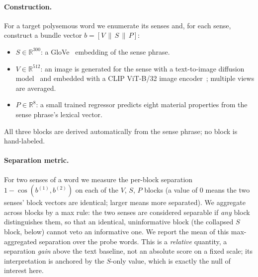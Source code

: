 \documentclass[twoside,11pt]{article}
\begin{document}
\paragraph{Construction.}
For a target polysemous word we enumerate its senses and, for each sense, construct a bundle vector $b = [V \,\|\, S \,\|\, P]$:
\begin{itemize}
\item $S \in \mathbb{R}^{300}$: a GloVe~\citep{pennington2014} embedding of the sense phrase.
\item $V \in \mathbb{R}^{512}$: an image is generated for the sense with a text-to-image diffusion model~\citep{rombach2022} and embedded with a CLIP ViT-B/32 image encoder~\citep{radford2021}; multiple views are averaged.
\item $P \in \mathbb{R}^{8}$: a small trained regressor predicts eight material properties from the sense phrase's lexical vector.
\end{itemize}
All three blocks are derived automatically from the sense phrase; no block is hand-labeled.

\paragraph{Separation metric.}
For two senses of a word we measure the per-block separation $1 - \cos(b^{(1)}, b^{(2)})$ on each of the $V$, $S$, $P$ blocks (a value of $0$ means the two senses' block vectors are identical; larger means more separated). We aggregate across blocks by a max rule: the two senses are considered separable if \emph{any} block distinguishes them, so that an identical, uninformative block (the collapsed $S$ block, below) cannot veto an informative one. We report the mean of this max-aggregated separation over the probe words. This is a \emph{relative} quantity, a separation \emph{gain} above the text baseline, not an absolute score on a fixed scale; its interpretation is anchored by the $S$-only value, which is exactly the null of interest here.
\end{document}

